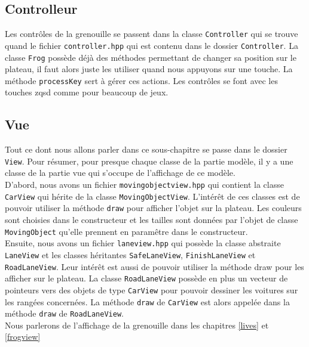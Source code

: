 \documentclass[a4paper, 12pt]{article}
\begin{document}
\subsection{Controlleur}

Les contrôles de la grenouille se passent dans la classe \texttt{Controller} qui se trouve quand le fichier \texttt{controller.hpp} qui est contenu dans le dossier \texttt{Controller}.
La classe \texttt{Frog} possède déjà des méthodes permettant de changer sa position sur le plateau, il faut alors juste les utiliser quand nous appuyons sur une touche. La méthode \texttt{processKey} sert à gérer ces actions. Les contrôles se font avec les touches zqsd comme pour beaucoup de jeux. 

\subsection{Vue}

Tout ce dont nous allons parler dans ce sous-chapitre se passe dans le dossier \texttt{View}. Pour résumer, pour presque chaque classe de la partie modèle, il y a une classe de la partie vue qui s'occupe de l'affichage de ce modèle. \\

D'abord, nous avons un fichier \texttt{movingobjectview.hpp} qui contient la classe \texttt{CarView} qui hérite de la classe \texttt{MovingObjectView}. L'intérêt de ces classes est de pouvoir utiliser la méthode \texttt{draw} pour afficher l'objet sur la plateau. Les couleurs sont choisies dans le constructeur et les tailles sont données par l'objet de classe \texttt{MovingObject} qu'elle prennent en paramêtre dans le constructeur. \\

Ensuite, nous avons un fichier \texttt{laneview.hpp} qui possède la classe abstraite \texttt{LaneView} et les classes héritantes \texttt{SafeLaneView}, \texttt{FinishLaneView} et \texttt{RoadLaneView}. Leur intérêt est aussi de pouvoir utiliser la méthode draw pour les afficher sur le plateau. La classe \texttt{RoadLaneView} possède en plus un vecteur de pointeurs vers des objets de type \texttt{CarView} pour pouvoir dessiner les voitures sur les rangées concernées. La méthode \texttt{draw} de \texttt{CarView} est alors appelée dans la méthode \texttt{draw} de \texttt{RoadLaneView}. \\

Nous parlerons de l'affichage de la grenouille dans les chapitres \ref{lives} et \ref{frogview}
\end{document}
